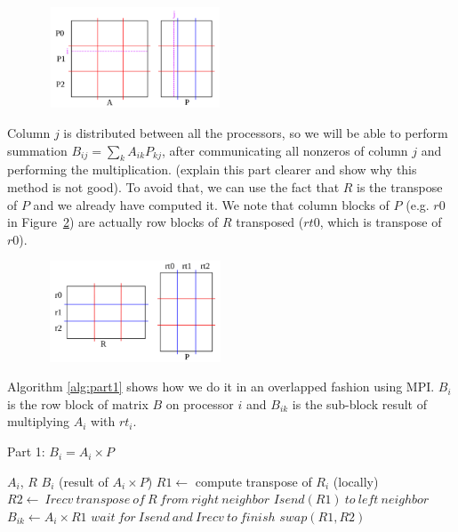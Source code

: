 \begin{figure}[tbh]
 \centering
 \includegraphics[width=5.5cm,height=3cm]{./figures/part1b.pdf}
 \caption{}
 \label{fig:part1b}
\end{figure}

Column $j$ is distributed between all the processors, so we will be able to perform  summation $B_{ij} = \sum_{k} A_{ik} P_{kj}$, after communicating all nonzeros of column $j$ and performing the multiplication. (explain this part clearer and show why this method is not good). To avoid that, we can use the fact that $R$ is the transpose of $P$ and we already have computed it. We note that column blocks of $P$ (e.g. $r0$ in Figure~\ref{fig:part1c}) are actually row blocks of $R$ transposed ($rt0$, which is transpose of $r0$).

\begin{figure}[tbh]
 \centering
 \includegraphics[width=5.5cm,height=3cm]{./figures/part1c.pdf}
 \caption{}
 \label{fig:part1c}
\end{figure}

Algorithm \ref{alg:part1} shows how we do it in an overlapped fashion using MPI. $B_{i}$ is the row block of matrix $B$ on processor $i$ and $B_{ik}$ is the sub-block result of multiplying $A_i$ with $rt_i$.

\begin{algorithm}[H] 
  \caption{Part 1: $B_i = A_i \times P$} \label{alg:part1} 
  \begin{algorithmic}[1]
    \Require $A_i$, $R$
    \Ensure  $B_i$ (result of $A_i \times P$)
    \State $R1 \leftarrow$ compute transpose of $R_i$ (locally)
      \State $R2 \leftarrow\ Irecv\ transpose\ of\ R\ from\ right\ neighbor$
      \State $Isend(R1)\ to\ left\ neighbor$
      \State $B_{ik} \leftarrow A_i \times R1$
      \State $wait\ for\ Isend\ and\ Irecv\ to\ finish$
      \State $swap(R1,R2)$
    \EndFor
  \end{algorithmic}
\end{algorithm}


